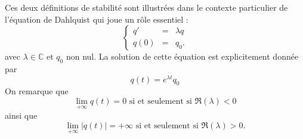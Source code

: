 Ces deux définitions de stabilité sont illustrées dans le contexte particulier de l'équation de Dahlquist qui joue un rôle essentiel :
\begin{equation}
\left\lbrace 
\begin{array}{rcl}
q' & = & \lambda q \\
q(0) & = & q_0.
\end{array}
\right.
\label{eq:dahlquist}
\end{equation}
avec $\lambda \in \mathbb{C}$ et $q_0$ non nul. La solution de cette équation est explicitement donnée par 
\begin{equation}
q(t) = e^{\lambda t} q_0
\end{equation}
On remarque que
\begin{equation}
\lim_{+ \infty} q(t) = 0 \text{ si et seulement si } \Re(\lambda) < 0
\end{equation}
ainsi que
\begin{equation}
\lim_{+ \infty} |q(t)| = + \infty \text{ si et seulement si } \Re(\lambda)>0.
\end{equation}

